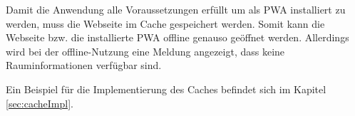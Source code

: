 


Damit die Anwendung alle Voraussetzungen erfüllt um als PWA installiert zu werden, muss die Webseite im Cache gespeichert werden. Somit kann die Webseite bzw. die installierte PWA offline genauso geöffnet werden. Allerdings wird bei der offline-Nutzung eine Meldung angezeigt, dass keine Rauminformationen verfügbar sind.

Ein Beispiel für die Implementierung des Caches befindet sich im Kapitel \ref{sec:cacheImpl}.
 